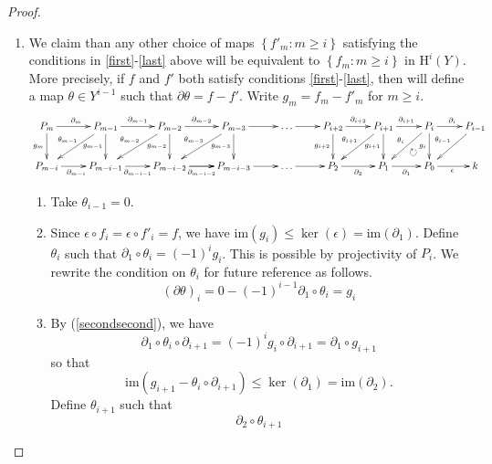 \documentclass[12pt]{article}
\newcounter{savedenumii}
\begin{document}
\begin{proof}
\begin{enumerate}
\item\label{otherf}
We claim than any other choice of maps
$\left\{f'_m:m\ge i\right\}$ 
satisfying the conditions in \ref{first}-\ref{last} above
will be equivalent to
$\left\{f_m:m\ge i\right\}$ in $\mathrm{H}^i\left(Y\right)$.
More precisely, if $f$ and $f'$ both satisfy
conditions \ref{first}-\ref{last}, 
then will define a map $\theta\in Y^{i-1}$
such that $\partial\theta=f-f'$.
Write $g_m=f_m-f'_m$ for $m\ge i$.
\begin{equation}
\begin{xy}{\xymatrix{
P_m\ar[r]^{\partial_m}\ar[d]_{g_m}
&P_{m-1}\ar[r]^{\partial_{m-1}}\ar[d]_{g_{m-1}}
\ar[dl]_{\theta_{m-1}}
&P_{m-2}\ar[r]^{\partial_{m-2}}\ar[d]_{g_{m-2}}
\ar[dl]_{\theta_{m-2}}
&P_{m-3}\ar[r]\ar[d]_{g_{m-3}}
\ar[dl]_{\theta_{m-3}}
&\dots\ar[r]
&P_{i+2}\ar[r]^{\partial_{i+2}}\ar[d]_{g_{i+2}}
&P_{i+1}\ar[r]^{\partial_{i+1}}\ar[d]_{g_{i+1}}
\ar[dl]_{\theta_{i+1}}
&P_i\ar[d]_{g_i}\ar[dl]_{\theta_i}\ar[r]^{\partial_{i}}
&P_{i-1}\ar[dl]_{\theta_{i-1}}
\\
P_{m-i}\ar[r]_{\partial_{m-i}}
&P_{m-i-1}\ar[r]_{\partial_{m-i-1}}
&P_{m-i-2}\ar[r]\ar[r]_{\partial_{m-i-2}}
&P_{m-i-3}\ar[r]
&\dots\ar[r]
&P_2\ar[r]_{\partial_2}
&P_1\ar[r]_{\partial_1}
&P_0\ar[r]_\epsilon
&k
}};
"2,8";"1,7"**{};
?(.35)*{\circlearrowright}
\end{xy}
\end{equation}
\begin{enumerate}
\setcounter{enumii}{\value{savedenumii}}
\item\label{secondfirst} Take $\theta_{i-1}=0$.
\item\label{secondsecond}
Since $\epsilon\circ f_i=\epsilon\circ f'_i=f$, we have
$\mathrm{im}\left(g_i\right)\le
\ker\left(\epsilon\right)=\mathrm{im}\left(\partial_1\right)$.
Define $\theta_i$ such that $\partial_1\circ\theta_i=\left(-1\right)^i g_i$.
This is possible by projectivity of $P_i$.
We rewrite the condition on $\theta_i$ for future reference as follows.
\begin{equation}\label{t1}
\left(\partial\theta\right)_i=
0-\left(-1\right)^{i-1}\partial_1\circ\theta_i=g_i
\end{equation}
\item By (\ref{secondsecond}), we have
\[\partial_1\circ\theta_i\circ\partial_{i+1}
=\left(-1\right)^i g_i\circ\partial_{i+1}
=\partial_1\circ g_{i+1}
\] so that 
\[\mathrm{im}\left(g_{i+1}-\theta_i\circ\partial_{i+1}\right)
\le\ker\left(\partial_1\right)=\mathrm{im}\left(\partial_2\right).\]
Define $\theta_{i+1}$
such that \[\partial_2\circ\theta_{i+1}
\]
\end{enumerate}
\end{enumerate}
\end{proof}
\end{document}
